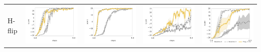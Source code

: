 \begin{table}
\begin{tabular}{m{} >{\centering}m{} >{\centering}m{} >{\centering}m{} >{\centering\arraybackslash}m{} }
	H-flip &
        \includegraphics[width=.22\textwidth]{figures/app_plots/pongs/pong_h_flip/pong_noise} &
        \includegraphics[width=.22\textwidth]{figures/app_plots/pongs/pong_h_flip/pong_v_flip} &
        \includegraphics[width=.22\textwidth]{figures/app_plots/pongs/pong_h_flip/pong_white} &
        \includegraphics[width=.22\textwidth]{figures/app_plots/pongs_legend/pong_h_flip/pong_zoom} \\
    \end{tabular}
\end{table}





